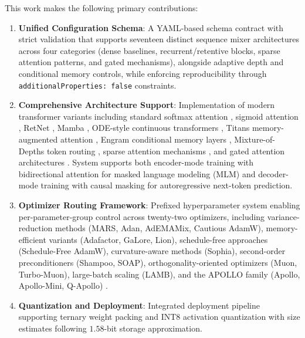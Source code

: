 \documentclass[11pt,a4paper]{article}
\begin{document}
This work makes the following primary contributions:
\begin{enumerate}[leftmargin=*]
    \item \textbf{Unified Configuration Schema}: A YAML-based schema contract with strict validation that supports seventeen distinct sequence mixer architectures across four categories (dense baselines, recurrent/retentive blocks, sparse attention patterns, and gated mechanisms), alongside adaptive depth and conditional memory controls, while enforcing reproducibility through \texttt{additionalProperties: false} constraints.
    \item \textbf{Comprehensive Architecture Support}: Implementation of modern transformer variants including standard softmax attention \citep{vaswani_attention_2017}, sigmoid attention \citep{ramapuram_theory_2024}, RetNet \citep{sun_retentive_2023}, Mamba \citep{gu_mamba_2023}, ODE-style continuous transformers \citep{zhang_continuous_2021}, Titans memory-augmented attention \citep{behrouz_titans_2025}, Engram conditional memory layers \citep{cheng2026conditionalmemoryscalablelookup}, Mixture-of-Depths token routing \citep{zhu2026mixtureofdepthsattention}, sparse attention mechanisms \citep{child_sparse_transformer_2019,beltagy_longformer_2020,zaheer_bigbird_2020,lou_sparsek_2024,yuan_nsa_2025,zhang_spargeattn_2025,wang_fasa_2026}, and gated attention architectures \citep{yang_gla_2023,yang_deltanet_2024,yang_gated_deltanet_2024,qin_hgrn2_2024,lin_forgetting_transformer_2025,qiu_gated_attention_2025}. System supports both encoder-mode training with bidirectional attention for masked language modeling (MLM) and decoder-mode training with causal masking for autoregressive next-token prediction.
    \item \textbf{Optimizer Routing Framework}: Prefixed hyperparameter system enabling per-parameter-group control across twenty-two optimizers, including variance-reduction methods (MARS, Adan, AdEMAMix, Cautious AdamW), memory-efficient variants (Adafactor, GaLore, Lion), schedule-free approaches (Schedule-Free AdamW), curvature-aware methods (Sophia), second-order preconditioners (Shampoo, SOAP), orthogonality-oriented optimizers (Muon, Turbo-Muon), large-batch scaling (LAMB), and the APOLLO family (Apollo, Apollo-Mini, Q-Apollo) \citep{zhu2025apollosgdlikememoryadamwlevel}.
    \item \textbf{Quantization and Deployment}: Integrated deployment pipeline supporting ternary weight packing and INT8 activation quantization with size estimates following $1.58$-bit storage approximation.

\end{enumerate}
\end{document}

